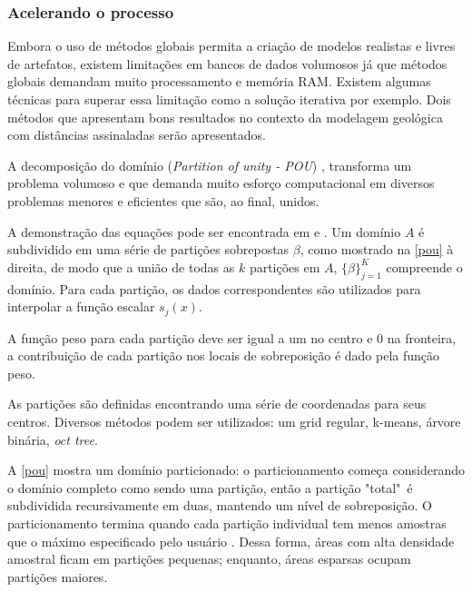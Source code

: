 \subsubsection{Acelerando o processo}

Embora o uso de métodos globais permita a criação de modelos realistas e livres de artefatos, existem limitações em bancos de dados volumosos já que métodos globais demandam muito processamento e memória RAM. Existem algumas técnicas para superar essa limitação como a solução iterativa \cite{beatson1999fast} por exemplo. Dois métodos que apresentam bons resultados no contexto da modelagem geológica com distâncias assinaladas serão apresentados.

 \label{dom_decomp}

A decomposição do domínio (\textit{Partition of unity - POU}) \cite{wendland2004scattered}, transforma um problema volumoso e que demanda muito esforço computacional em diversos problemas menores e eficientes que são, ao final, unidos.

A demonstração das equações pode ser encontrada em  e . Um domínio $A$ é subdividido em uma série de partições sobrepostas $\beta$, como mostrado na \autoref{pou} à direita, de modo que a união de todas as $k$ partições em $A$, $\{ \beta \}^K_{j=1}$ compreende o domínio. Para cada partição, os dados correspondentes são utilizados para interpolar a função escalar $s_j(x)$.

A função peso para cada partição deve ser igual a um no centro e 0 na fronteira, a contribuição de cada partição nos locais de sobreposição é dado pela função peso.

As partições são definidas encontrando uma série de coordenadas para seus centros. Diversos métodos podem ser utilizados: um grid regular, k-means, árvore binária, \textit{oct tree}.

A \autoref{pou} mostra um domínio particionado: o particionamento começa considerando o domínio completo como sendo uma partição, então a partição "total"\ é subdividida recursivamente em duas, mantendo um nível de sobreposição. O particionamento termina quando cada partição individual tem menos amostras que o máximo especificado pelo usuário \cite{martin2017implicitmodeling, martin2017iterative}. Dessa forma, áreas com alta densidade amostral ficam em partições pequenas; enquanto, áreas esparsas ocupam partições maiores.

